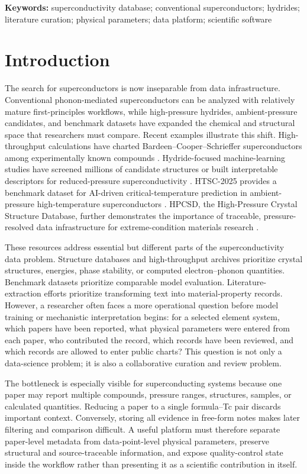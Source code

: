 \documentclass[11pt,a4paper]{article}
\begin{document}
\noindent\textbf{Keywords:} superconductivity database; conventional superconductors; hydrides; literature curation; physical parameters; data platform; scientific software

\section{Introduction}

The search for superconductors is now inseparable from data infrastructure. Conventional phonon-mediated superconductors can be analyzed with relatively mature first-principles workflows, while high-pressure hydrides, ambient-pressure candidates, and benchmark datasets have expanded the chemical and structural space that researchers must compare. Recent examples illustrate this shift. High-throughput calculations have charted Bardeen--Cooper--Schrieffer superconductors among experimentally known compounds \cite{bercx2025prxenergy}. Hydride-focused machine-learning studies have screened millions of candidate structures or built interpretable descriptors for reduced-pressure superconductivity \cite{pires2026ambient,chen2026descriptors}. HTSC-2025 provides a benchmark dataset for AI-driven critical-temperature prediction in ambient-pressure high-temperature superconductors \cite{han2025htsc}. HPCSD, the High-Pressure Crystal Structure Database, further demonstrates the importance of traceable, pressure-resolved data infrastructure for extreme-condition materials research \cite{wang2026hpcsd}.

These resources address essential but different parts of the superconductivity data problem. Structure databases and high-throughput archives prioritize crystal structures, energies, phase stability, or computed electron--phonon quantities. Benchmark datasets prioritize comparable model evaluation. Literature-extraction efforts prioritize transforming text into material-property records. However, a researcher often faces a more operational question before model training or mechanistic interpretation begins: for a selected element system, which papers have been reported, what physical parameters were entered from each paper, who contributed the record, which records have been reviewed, and which records are allowed to enter public charts? This question is not only a data-science problem; it is also a collaborative curation and review problem.

The bottleneck is especially visible for superconducting systems because one paper may report multiple compounds, pressure ranges, structures, samples, or calculated quantities. Reducing a paper to a single formula--Tc pair discards important context. Conversely, storing all evidence in free-form notes makes later filtering and comparison difficult. A useful platform must therefore separate paper-level metadata from data-point-level physical parameters, preserve structural and source-traceable information, and expose quality-control state inside the workflow rather than presenting it as a scientific contribution in itself.
\end{document}
